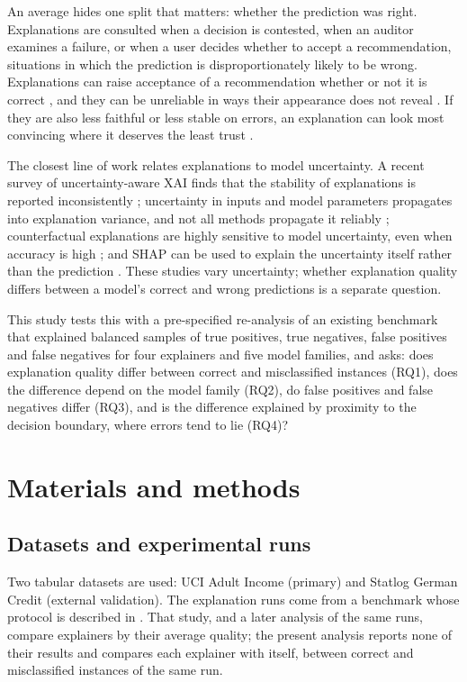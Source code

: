 \documentclass[12pt,letterpaper]{article}
\begin{document}
An average hides one split that matters: whether the prediction was right. Explanations
are consulted when a decision is contested, when an auditor examines a failure, or when a
user decides whether to accept a recommendation, situations in which the prediction is
disproportionately likely to be wrong. Explanations can raise acceptance of a
recommendation whether or not it is correct \cite{bansal2021whole}, and they can be
unreliable in ways their appearance does not reveal \cite{adebayo2018sanity,slack2020fooling}.
If they are also less faithful or less stable on errors, an explanation can look most
convincing where it deserves the least trust \cite{rudin2019stop}.

The closest line of work relates explanations to model uncertainty. A recent survey of
uncertainty-aware XAI finds that the stability of explanations is reported inconsistently
\cite{lofstrom2026concerning}; uncertainty in inputs and model parameters propagates into
explanation variance, and not all methods propagate it reliably
\cite{chiaburu2026uncertainty}; counterfactual explanations are highly sensitive to model
uncertainty, even when accuracy is high \cite{christodoulou2026impact}; and SHAP can be
used to explain the uncertainty itself rather than the prediction
\cite{cheng2026uncertainty}. These studies vary uncertainty; whether explanation quality differs between a
model's correct and wrong predictions is a separate question.

This study tests this with a pre-specified re-analysis of an existing benchmark that explained
balanced samples of true positives, true negatives, false positives and false negatives
for four explainers and five model families, and asks: does explanation quality differ
between correct and misclassified instances (RQ1), does the difference depend on the
model family (RQ2), do false positives and false negatives differ (RQ3), and is the
difference explained by proximity to the decision boundary, where errors tend to lie
(RQ4)?

\section{Materials and methods}

\subsection{Datasets and experimental runs}

Two tabular datasets are used: UCI Adult Income \cite{becker1996adult} (primary) and Statlog
German Credit \cite{hofmann1994statlog} (external validation). The explanation runs come from
a benchmark whose protocol is described in \cite{herrera2026framework}. That study, and a
later analysis of the same runs, compare explainers by their average quality; the present
analysis reports none of their results and compares each explainer with itself, between
correct and misclassified instances of the same run.
\end{document}
